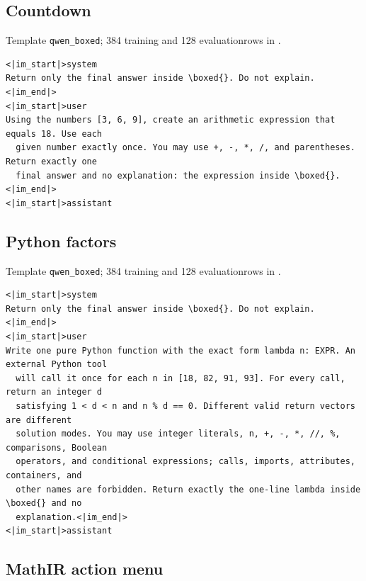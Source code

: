 \documentclass{article}
\newcommand{\1}{\mathbf 1}
\theoremstyle{remark}
\theoremstyle{definition}
\theoremstyle{plain}
\begin{document}
\subsection{Countdown}
\label{app:prompt-countdown}

\noindent Template \texttt{qwen\_boxed}; 384 training and 128 evaluation\linebreak rows in .

\begin{Verbatim}[fontsize=\scriptsize,frame=single,framesep=4pt,rulecolor=\color{black!25}]
<|im_start|>system
Return only the final answer inside \boxed{}. Do not explain.<|im_end|>
<|im_start|>user
Using the numbers [3, 6, 9], create an arithmetic expression that equals 18. Use each
  given number exactly once. You may use +, -, *, /, and parentheses. Return exactly one
  final answer and no explanation: the expression inside \boxed{}.<|im_end|>
<|im_start|>assistant
\end{Verbatim}

\subsection{Python factors}
\label{app:prompt-python}

\noindent Template \texttt{qwen\_boxed}; 384 training and 128 evaluation\linebreak rows in .

\begin{Verbatim}[fontsize=\scriptsize,frame=single,framesep=4pt,rulecolor=\color{black!25}]
<|im_start|>system
Return only the final answer inside \boxed{}. Do not explain.<|im_end|>
<|im_start|>user
Write one pure Python function with the exact form lambda n: EXPR. An external Python tool
  will call it once for each n in [18, 82, 91, 93]. For every call, return an integer d
  satisfying 1 < d < n and n % d == 0. Different valid return vectors are different
  solution modes. You may use integer literals, n, +, -, *, //, %, comparisons, Boolean
  operators, and conditional expressions; calls, imports, attributes, containers, and
  other names are forbidden. Return exactly the one-line lambda inside \boxed{} and no
  explanation.<|im_end|>
<|im_start|>assistant
\end{Verbatim}

\subsection{MathIR action menu}
\label{app:prompt-mathir}
\end{document}
